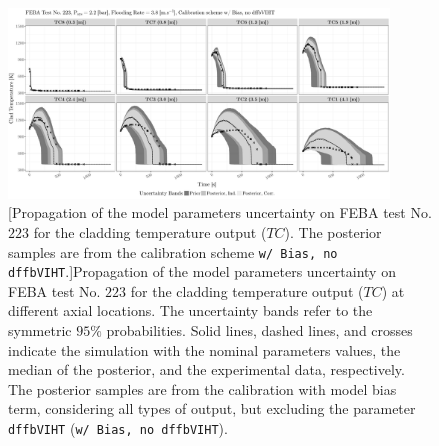 \clearpage
\begin{figure}
	\centering
	\includegraphics[width=0.90\textwidth]{../figures/chapter5/figures/plotTraceUQPosteriorAllDiscCenteredNoParam8TC223}
		[Propagation of the model parameters uncertainty on FEBA test No. $223$ for the cladding temperature output ($TC$). The posterior samples are from the calibration scheme \texttt{w/ Bias, no dffbVIHT}.]{Propagation of the model parameters uncertainty on FEBA test No. $223$ for the cladding temperature output ($TC$) at different axial locations. The uncertainty bands refer to the symmetric $95\%$ probabilities. Solid lines, dashed lines, and crosses indicate the simulation with the nominal parameters values, the median of the posterior, and the experimental data, respectively. The posterior samples are from the calibration with model bias term, considering all types of output, but excluding the parameter \texttt{dffbVIHT} (\texttt{w/ Bias, no dffbVIHT}).}
	\label{fig:ch5_plot_trace_uq_post_tc_223_noparam8}
\end{figure}
\clearpage

